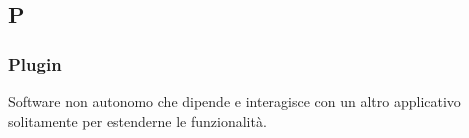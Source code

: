 \subsection*{\textbf{\hfill \Huge{P} \hfill}} 
\subsubsection*{Plugin}
Software non autonomo che dipende e interagisce con un altro applicativo solitamente per estenderne le funzionalità.